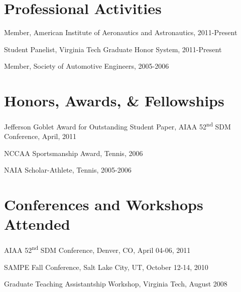 \documentclass[10pt,letterpaper]{article}
\renewenvironment{itemize}{
  \begin{list}{}{
    \setlength{\leftmargin}{1.5em}
    \setlength{\itemsep}{0.25em}
    \setlength{\parskip}{0pt}
    \setlength{\parsep}{0.25em}
  }
}{
  \end{list}
}
\begin{document}
%
%

\section*{Professional Activities}
\begin{itemize}
\item Member, American Institute of Aeronautics and Astronautics, 2011-Present
\item Student Panelist, Virginia Tech Graduate Honor System, 2011-Present
\item Member, Society of Automotive Engineers, 2005-2006
\end{itemize}

\section*{Honors, Awards, \& Fellowships}

\begin{itemize}
\item Jefferson Goblet Award for Outstanding Student Paper, AIAA 52\textsuperscript{nd} SDM Conference, April, 2011
\item NCCAA Sportsmanship Award, Tennis, 2006
\item NAIA Scholar-Athlete, Tennis, 2005-2006
\end{itemize}

\section*{Conferences and Workshops Attended}

\begin{itemize}
\item AIAA 52\textsuperscript{nd} SDM Conference, Denver, CO, April 04-06, 2011
\item SAMPE Fall Conference, Salt Lake City, UT, October 12-14, 2010
\item Graduate Teaching Assistantship Workshop, Virginia Tech, August 2008
\end{itemize}
\end{document}
